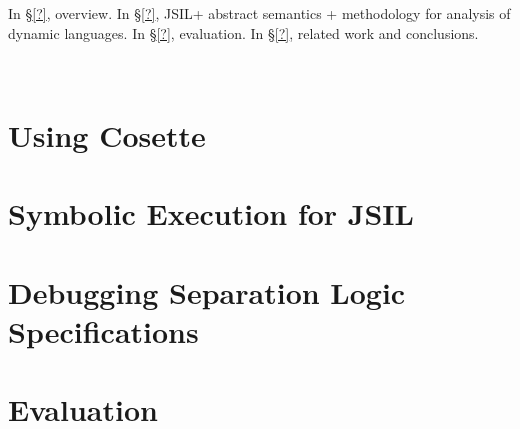 \documentclass[sigconf, anonymous, review]{acmart}
\newcommand{\jsil}{JSIL\xspace}
\newcommand{\polish}[1]{{\color{red}#1}}
\newcommand{\cosette}{Cosette\xspace}
\newcommand{\myparagraph}[1]{\smallskip\noindent {\bf #1.}\hspace{1pt}}
\newif\ifComments
\newcommand{\pmax}[1]{%
\ifComments
\begin{center}
\fbox{\begin{minipage}{0.4\textwidth} \color{blue}
{\rm PM: \small #1}
\end{minipage}}
\end{center}
\fi}
\begin{document}
\pmax{I would like a summary of what is where.}

In \S\ref{?}, overview. In \S\ref{?}, \jsil + abstract semantics + methodology for analysis of dynamic languages. In \S\ref{?}, evaluation. In \S\ref{?}, related work and conclusions.

\newpage

%
%
%
%




\newpage \ \newpage
\section{Using \cosette}\label{sec:overview}



\newpage
\section{Symbolic Execution for \jsil}\label{sec:jsil:symb:exec}


\section{Debugging Separation Logic Specifications}\label{sec:specs}
%

\newpage
\section{Evaluation}\label{sec:evaluation}

\end{document}
